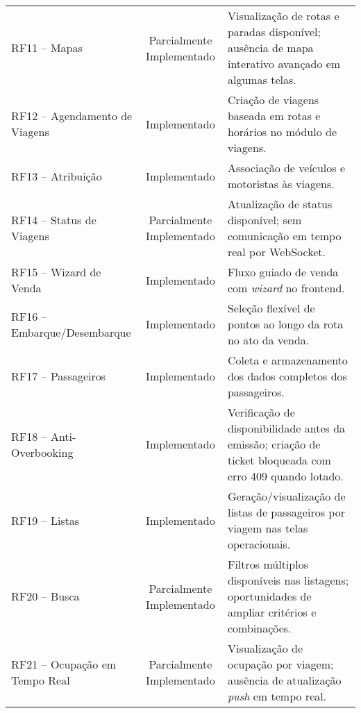 \begin{table}[htbp]
{\begin{tabular}{|l|c|p{9.5cm}|}
      RF11 -- Mapas                  & Parcialmente Implementado & Visualização de rotas e paradas disponível; ausência de mapa interativo avançado em algumas telas.       \\
      RF12 -- Agendamento de Viagens & Implementado              & Criação de viagens baseada em rotas e horários no módulo de viagens.                                     \\
      RF13 -- Atribuição             & Implementado              & Associação de veículos e motoristas às viagens.                                                          \\
      RF14 -- Status de Viagens      & Parcialmente Implementado & Atualização de status disponível; sem comunicação em tempo real por WebSocket.                           \\
      RF15 -- Wizard de Venda        & Implementado              & Fluxo guiado de venda com \textit{wizard} no frontend.                                                   \\
      RF16 -- Embarque/Desembarque   & Implementado              & Seleção flexível de pontos ao longo da rota no ato da venda.                                             \\
      RF17 -- Passageiros            & Implementado              & Coleta e armazenamento dos dados completos dos passageiros.                                              \\
      RF18 -- Anti-Overbooking       & Implementado              & Verificação de disponibilidade antes da emissão; criação de ticket bloqueada com erro 409 quando lotado. \\
      RF19 -- Listas                 & Implementado              & Geração/visualização de listas de passageiros por viagem nas telas operacionais.                         \\
      RF20 -- Busca                  & Parcialmente Implementado & Filtros múltiplos disponíveis nas listagens; oportunidades de ampliar critérios e combinações.           \\
      RF21 -- Ocupação em Tempo Real & Parcialmente Implementado & Visualização de ocupação por viagem; ausência de atualização \textit{push} em tempo real.                \\
      \hline
    \end{tabular}%
  }
\end{table}

